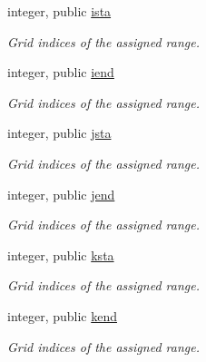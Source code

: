 \textbf{ }\par
\begin{DoxyCompactItemize}
\item 
integer, public \mbox{\hyperlink{namespacempi__subdomain_ab8925faaa6f45326c1d11efa37e03566}{ista}}
\begin{DoxyCompactList}\small\item\em Grid indices of the assigned range. \end{DoxyCompactList}\item 
integer, public \mbox{\hyperlink{namespacempi__subdomain_abbd7d35107c53bcfd2b2b52771f4aa67}{iend}}
\begin{DoxyCompactList}\small\item\em Grid indices of the assigned range. \end{DoxyCompactList}\item 
integer, public \mbox{\hyperlink{namespacempi__subdomain_ac85bfba1caf77f9c3c0047fe9450fee6}{jsta}}
\begin{DoxyCompactList}\small\item\em Grid indices of the assigned range. \end{DoxyCompactList}\item 
integer, public \mbox{\hyperlink{namespacempi__subdomain_a06433a0d1a081c51202a0010c21c9d36}{jend}}
\begin{DoxyCompactList}\small\item\em Grid indices of the assigned range. \end{DoxyCompactList}\item 
integer, public \mbox{\hyperlink{namespacempi__subdomain_acd499eb1d07159aa9f5c878f9519b00f}{ksta}}
\begin{DoxyCompactList}\small\item\em Grid indices of the assigned range. \end{DoxyCompactList}\item 
integer, public \mbox{\hyperlink{namespacempi__subdomain_af9934313b1ccbcb09f30916df3326076}{kend}}
\begin{DoxyCompactList}\small\item\em Grid indices of the assigned range. \end{DoxyCompactList}\end{DoxyCompactItemize}

